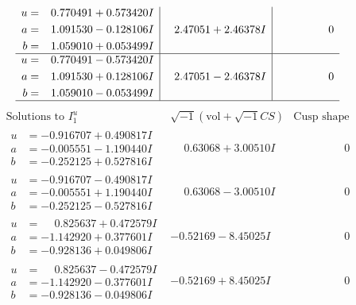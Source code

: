 \documentclass[1p]{elsarticle_modified}
\theoremstyle{definition}
\newcommand{\I}{\sqrt{-1}}
\begin{document}
$$\begin{array}{c|c|c}
\begin{aligned}
u &= \phantom{-}0.770491 + 0.573420 I \\
a &= \phantom{-}1.091530 - 0.128106 I \\
b &= \phantom{-}1.059010 + 0.053499 I\end{aligned}
 & \phantom{-}2.47051 + 2.46378 I & \phantom{-0.000000 } 0 \\ \hline\begin{aligned}
u &= \phantom{-}0.770491 - 0.573420 I \\
a &= \phantom{-}1.091530 + 0.128106 I \\
b &= \phantom{-}1.059010 - 0.053499 I\end{aligned}
 & \phantom{-}2.47051 - 2.46378 I & \phantom{-0.000000 } 0\\
 \hline 
 \end{array}$$\newpage$$\begin{array}{c|c|c}  
\text{Solutions to }I^u_{1}& \I (\text{vol} + \sqrt{-1}CS) & \text{Cusp shape}\\
 \hline 
\begin{aligned}
u &= -0.916707 + 0.490817 I \\
a &= -0.005551 - 1.190440 I \\
b &= -0.252125 + 0.527816 I\end{aligned}
 & \phantom{-}0.63068 + 3.00510 I & \phantom{-0.000000 } 0 \\ \hline\begin{aligned}
u &= -0.916707 - 0.490817 I \\
a &= -0.005551 + 1.190440 I \\
b &= -0.252125 - 0.527816 I\end{aligned}
 & \phantom{-}0.63068 - 3.00510 I & \phantom{-0.000000 } 0 \\ \hline\begin{aligned}
u &= \phantom{-}0.825637 + 0.472579 I \\
a &= -1.142920 + 0.377601 I \\
b &= -0.928136 + 0.049806 I\end{aligned}
 & -0.52169 - 8.45025 I & \phantom{-0.000000 } 0 \\ \hline\begin{aligned}
u &= \phantom{-}0.825637 - 0.472579 I \\
a &= -1.142920 - 0.377601 I \\
b &= -0.928136 - 0.049806 I\end{aligned}
 & -0.52169 + 8.45025 I & \phantom{-0.000000 } 0 \\ \hline\begin{aligned}

\end{aligned}
\end{array}$$
\end{document}
